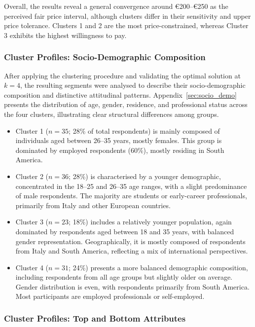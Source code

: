\documentclass[a4paper, 12pt, twoside]{report}  %
\begin{document}
\indent Overall, the results reveal a general convergence around €200–€250 as the perceived fair price interval, although clusters differ in their sensitivity and upper price tolerance. Clusters 1 and 2 are the most price-constrained, whereas Cluster 3 exhibits the highest willingness to pay.

\subsubsection{Cluster Profiles: Socio-Demographic Composition}

\indent After applying the clustering procedure and validating the optimal solution at $k = 4$, the resulting segments were analysed to describe their socio-demographic composition and distinctive attitudinal patterns. Appendix~\ref{sec:socio_demo} presents the distribution of age, gender, residence, and professional status across the four clusters, illustrating clear structural differences among groups.

\begin{itemize}
\item Cluster 1 ($n = 35$; 28\% of total respondents) is mainly composed of individuals aged between 26–35 years, mostly females. This group is dominated by employed respondents (60\%), mostly residing in South America.
\item Cluster 2 ($n = 36$; 28\%) is characterised by a younger demographic, concentrated in the 18–25 and 26–35 age ranges, with a slight predominance of male respondents. The majority are students or early-career professionals, primarily from Italy and other European countries.
\item Cluster 3 ($n = 23$; 18\%) includes a relatively younger population, again dominated by respondents aged between 18 and 35 years, with balanced gender representation. Geographically, it is mostly composed of respondents from Italy and South America, reflecting a mix of international perspectives.
\item Cluster 4 ($n = 31$; 24\%) presents a more balanced demographic composition, including respondents from all age groups but slightly older on average. Gender distribution is even, with respondents primarily from South America. Most participants are employed professionals or self-employed.
\end{itemize}

\subsubsection{Cluster Profiles: Top and Bottom Attributes}
\end{document}
